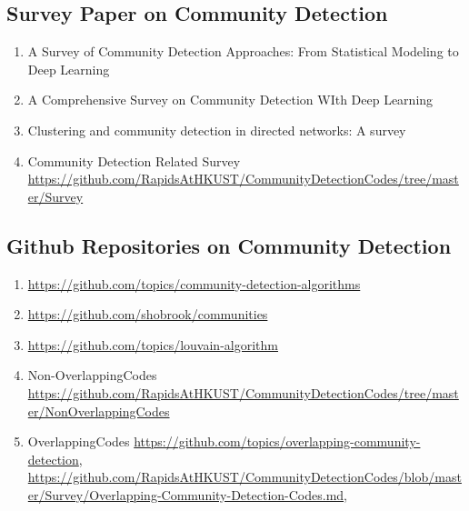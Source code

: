 \documentclass{article}
\begin{document}
\subsection{Survey Paper on Community Detection}
\begin{enumerate}
    \item A Survey of Community Detection Approaches: From Statistical Modeling to Deep Learning \cite{jin2021survey}
    \item A Comprehensive Survey on Community Detection WIth Deep Learning \cite{su2022comprehensive}
    \item Clustering and community detection in directed networks: A survey \cite{malliaros2013clustering}
    \item Community Detection Related Survey \url{https://github.com/RapidsAtHKUST/CommunityDetectionCodes/tree/master/Survey}
 \end{enumerate}  

\subsection{Github Repositories on Community Detection}
\begin{enumerate}
    \item \url{https://github.com/topics/community-detection-algorithms}
    \item \url{https://github.com/shobrook/communities}
    \item \url{https://github.com/topics/louvain-algorithm}
    \item Non-OverlappingCodes \url{https://github.com/RapidsAtHKUST/CommunityDetectionCodes/tree/master/NonOverlappingCodes}
    \item OverlappingCodes \url{https://github.com/topics/overlapping-community-detection}, \url{https://github.com/RapidsAtHKUST/CommunityDetectionCodes/blob/master/Survey/Overlapping-Community-Detection-Codes.md}, 
    
 \end{enumerate}  



% 


\end{document}
